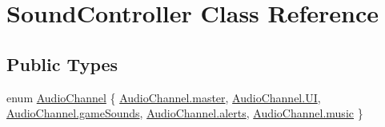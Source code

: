 \hypertarget{class_sound_controller}{}\section{Sound\+Controller Class Reference}
\label{class_sound_controller}
\subsection*{Public Types}
\begin{DoxyCompactItemize}
\item 
enum \hyperlink{class_sound_controller_a1decb27e541146cfadf5becf24e5fa1b}{Audio\+Channel} \{ \newline
\hyperlink{class_sound_controller_a1decb27e541146cfadf5becf24e5fa1baeb0a191797624dd3a48fa681d3061212}{Audio\+Channel.\+master}, 
\hyperlink{class_sound_controller_a1decb27e541146cfadf5becf24e5fa1ba71ff71526d15db86eb50fcac245d183b}{Audio\+Channel.\+UI}, 
\hyperlink{class_sound_controller_a1decb27e541146cfadf5becf24e5fa1bac5bc36183d001a9c0771d46f7ef922d2}{Audio\+Channel.\+game\+Sounds}, 
\hyperlink{class_sound_controller_a1decb27e541146cfadf5becf24e5fa1baabca7cba75e5a9ff86b1490f32891f82}{Audio\+Channel.\+alerts}, 
\newline
\hyperlink{class_sound_controller_a1decb27e541146cfadf5becf24e5fa1ba18d6769919266cd0bd6cd78aa405d5d0}{Audio\+Channel.\+music}
 \}
\end{DoxyCompactItemize}

